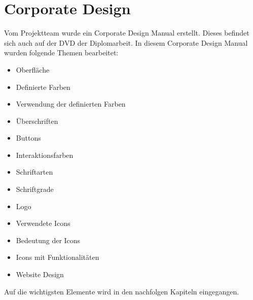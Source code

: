 \section{Corporate Design}
Vom Projektteam wurde ein Corporate Design Manual erstellt. Dieses befindet sich auch auf der DVD der Diplomarbeit. In diesem Corporate Design Manual wurden folgende Themen bearbeitet: 
\begin{itemize}
	\item Oberfläche
	\item Definierte Farben
	\item Verwendung der definierten Farben
	\item Überschriften
	\item Buttons 
	\item Interaktionsfarben
	\item Schriftarten
	\item Schriftgrade
	\item Logo
	\item Verwendete Icons
	\item Bedeutung der Icons 
	\item Icons mit Funktionalitäten 	
	\item Website Design

\end{itemize}
Auf die wichtigsten Elemente wird in den nachfolgen Kapiteln eingegangen.
